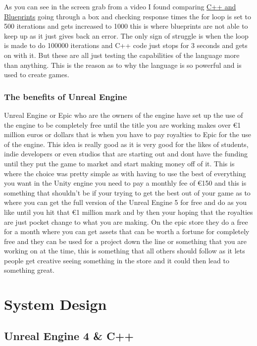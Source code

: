 As you can see in the screen grab from a video I found comparing  \href{https://www.youtube.com/watch?v=V707r4bkJOY&ab_channel=altalt}{C++ and Blueprints} going through a box and checking response times the for loop is set to 500 iterations and gets increased to 1000 this is where blueprints are not able to keep up as it just gives back an error. The only sign of struggle is when the loop is made to do 100000 iterations and C++ code just stops for 3 seconds and gets on with it. But these are all just testing the capabilities of the language more than anything. This is the reason as to why the language is so powerful and is used to create games.
\subsection{The benefits of Unreal Engine}
Unreal Engine or Epic who are the owners of the engine have set up the use of the engine to be completely free until the title you are working makes over €1 million euros or dollars that is when you have to pay royalties to Epic for the use of the engine. This idea is really good as it is very good for the likes of students, indie developers or even studios that are starting out and dont have the funding until they put the game to market and start making money off of it. This is where the choice was pretty simple as with having to use the best of everything you want in the Unity engine you need to pay a monthly fee of €150 and this is something that shouldn't be if your trying to get the best out of your game as to where you can get the full version of the Unreal Engine 5 for free and do as you like until you hit that €1 million mark and by then your hoping that the royalties are just pocket change to what you are making. On the epic store they do a free for a month where you can get assets that can be worth a fortune for completely free and they can be used for a project down the line or something that you are working on at the time, this is something that all others should follow as it lets people get creative seeing something in the store and it could then lead to something great.
\chapter{System Design}
\section{Unreal Engine 4 \& C++}
